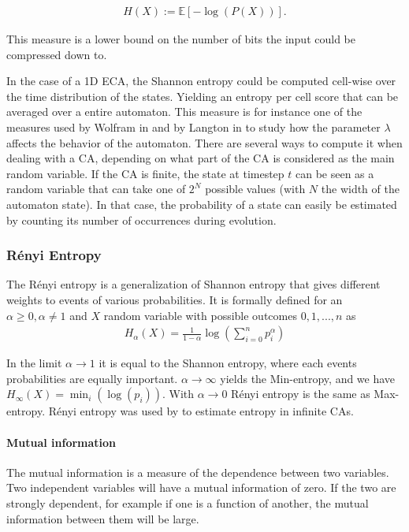 \begin{align*}
  H(X) := \mathbb{E}[-\log(P(X))].
\end{align*}

This measure is a lower bound on the number of bits the input could be
compressed down to.

In the case of a 1D \ac{ECA}, the Shannon entropy could be computed cell-wise
over the time distribution of the states. Yielding an entropy per cell score
that can be averaged over a entire automaton. This measure is for instance one
of the measures used by Wolfram in
\parencite{wolframStatisticalMechanicsCellular1983} and by Langton in
\parencite{langtonComputationEdgeChaos1990} to study how the parameter $\lambda$
affects the behavior of the automaton. There are several ways to compute it when
dealing with a CA, depending on what part of the CA is considered as the main
random variable. If the CA is finite, the state at timestep $t$ can be seen as a
random variable that can take one of $2^N$ possible values (with $N$ the width
of the automaton state). In that case, the probability of a state can easily be
estimated by counting its number of occurrences during evolution.

\subsubsection{Rényi Entropy}
The Rényi entropy is a generalization of Shannon entropy that gives different
weights to events of various probabilities. It is formally defined for an
$\alpha \geq 0, \alpha \neq 1$ and $X$ random variable with possible outcomes
$0, 1, ..., n$ as
\begin{align*}
  H_\alpha(X) = \frac{1}{1-\alpha} \log\left(\sum_{i=0}^np_i^\alpha\right)
\end{align*}

In the limit $\alpha \rightarrow 1$ it is equal to the Shannon entropy, where
each events probabilities are equally important. $\alpha \rightarrow \infty$
yields the Min-entropy, and we have $H_{\infty} (X) = \min_{i}(\log(p_{i}))$.
With $\alpha \rightarrow 0$ Rényi entropy is the same as Max-entropy. Rényi
entropy was used by \textcite{wolframStatisticalMechanicsCellular1983} to
estimate entropy in infinite CAs.

\paragraph{Mutual information}
The mutual information is a measure of the dependence between two variables. Two
independent variables will have a mutual information of zero. If the two are
strongly dependent, for example if one is a function of another, the mutual
information between them will be large.

